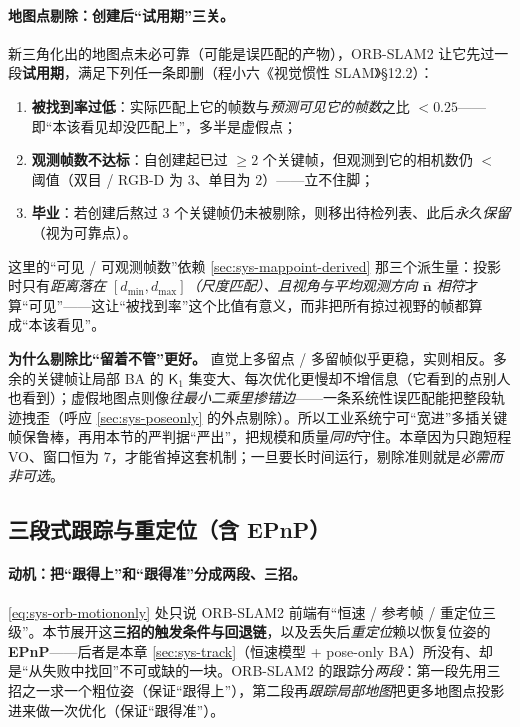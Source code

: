\paragraph{地图点剔除：创建后“试用期”三关。}
新三角化出的地图点未必可靠（可能是误匹配的产物），ORB-SLAM2 让它先过一段\textbf{试用期}，满足下列任一条即删（程小六《视觉惯性 SLAM》§12.2）：
\begin{enumerate}
  \item \textbf{被找到率过低}：实际匹配上它的帧数与\emph{预测可见它的帧数}之比 $<0.25$——即“本该看见却没匹配上”，多半是虚假点；
  \item \textbf{观测帧数不达标}：自创建起已过 $\ge 2$ 个关键帧，但观测到它的相机数仍 $<$ 阈值（双目 / RGB-D 为 $3$、单目为 $2$）——立不住脚；
  \item \textbf{毕业}：若创建后熬过 $3$ 个关键帧仍未被剔除，则移出待检列表、此后\emph{永久保留}（视为可靠点）。
\end{enumerate}
这里的“可见 / 可观测帧数”依赖 \cref{sec:sys-mappoint-derived} 那三个派生量：投影时只有\emph{距离落在 $[d_{\min},d_{\max}]$（尺度匹配）、且视角与平均观测方向 $\bar{\mathbf{n}}$ 相符}才算“可见”——这让“被找到率”这个比值有意义，而非把所有掠过视野的帧都算成“本该看见”。

\begin{insight}
\textbf{为什么剔除比“留着不管”更好。}
直觉上多留点 / 多留帧似乎更稳，实则相反。多余的关键帧让局部 BA 的 $\mathsf{K}_1$ 集变大、每次优化更慢却不增信息（它看到的点别人也看到）；虚假地图点则像\emph{往最小二乘里掺错边}——一条系统性误匹配能把整段轨迹拽歪（呼应 \cref{sec:sys-poseonly} 的外点剔除）。所以工业系统宁可“宽进”多插关键帧保鲁棒，再用本节的严判据“严出”，把规模和质量\emph{同时}守住。本章因为只跑短程 VO、窗口恒为 $7$，才能省掉这套机制；一旦要长时间运行，剔除准则就是\emph{必需而非可选}。
\end{insight}

\subsection{三段式跟踪与重定位（含 EPnP）}
\label{sec:sys-tracking-orb}

\paragraph{动机：把“跟得上”和“跟得准”分成两段、三招。}
\cref{eq:sys-orb-motiononly} 处只说 ORB-SLAM2 前端有“恒速 / 参考帧 / 重定位三级”。本节展开这\textbf{三招的触发条件与回退链}，以及丢失后\emph{重定位}赖以恢复位姿的 \textbf{EPnP}——后者是本章 \cref{sec:sys-track}（恒速模型 + pose-only BA）所没有、却是“从失败中找回”不可或缺的一块。ORB-SLAM2 的跟踪分\emph{两段}：第一段先用三招之一求一个粗位姿（保证“跟得上”），第二段再\emph{跟踪局部地图}把更多地图点投影进来做一次优化（保证“跟得准”）。


